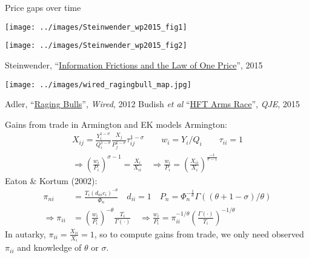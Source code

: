 \documentclass[10pt,notes=hide]{beamer}
\begin{document}
\begin{frame}{Price gaps over time}
\begin{minipage}{.47\textwidth}\vspace{0pt}\texttt{[image: ../images/Steinwender\_wp2015\_fig1]}\end{minipage}
\begin{minipage}{.47\textwidth}\vspace{0pt}\texttt{[image: ../images/Steinwender\_wp2015\_fig2]}\end{minipage}
\begin{center}\footnotesize{Steinwender, ``\href{https://sites.google.com/site/clsteinwender/home/research}{Information Frictions and the Law of One Price}'', 2015} \end{center}
\texttt{[image: ../images/wired\_ragingbull\_map.jpg]}
\begin{center}\footnotesize{Adler, ``\href{https://www.wired.com/2012/08/ff_wallstreet_trading/}{Raging Bulls}'', \textit{Wired}, 2012} \hfill Budish \textit{et al} ``\href{https://faculty.chicagobooth.edu/eric.budish/research/HFT-FrequentBatchAuctions.pdf}{HFT Arms Race}'', \textit{QJE}, 2015 \end{center}
\end{frame}
\begin{frame}{Gains from trade in Armington and EK models}
Armington:
	\begin{align*}
	X_{ij}
	= \frac{Y_i^{1-\sigma}}{Q_i^{1-\sigma}} \frac{X_j}{P_j^{1-\sigma}}\tau_{ij}^{1-\sigma} 
	\qquad w_i =  Y_i / Q_i
	\qquad \tau_{ii}=1
	\\
	\Rightarrow
	\left(\frac{w_i}{P_i}\right)^{\sigma-1}
	=
	\frac{X_i}{X_{ii}}
	\quad 
	\Rightarrow
	\frac{w_i}{P_i} 
	=\left(\frac{X_{ii}}{X_i}\right)^{\frac{-1}{\sigma-1}}
	\end{align*}
Eaton \& Kortum (2002):
\begin{align*}
	\pi_{ni}
	&=
	\frac{T_{i}\left(d_{ni}c_{i}\right) ^{-\theta}}{\Phi_{n}}
	\quad d_{ii}=1
	\quad P_{n} = \Phi _{n}^{-\frac{1}{\theta }} \Gamma \left( \left({\theta +1-\sigma}\right) / {\theta}\right)
	\\
	\Rightarrow
	\pi_{ii}
	&= \left(\frac{w_i}{P_i}\right)^{-\theta} \frac{T_i}{\Gamma(\cdot)}
	\quad
	\Rightarrow
	\frac{w_i}{P_i}
	=
	\pi_{ii}^{-1/\theta} \left(\frac{\Gamma(\cdot)}{T_i}\right)^{-1/\theta}
\end{align*}
In autarky, $\pi_{ii} = \frac{X_{ii}}{X_i} = 1$,
so to compute gains from trade,
we only need observed $\pi_{ii}$ and knowledge of $\theta$ or $\sigma$.
\end{frame}
\end{document}
